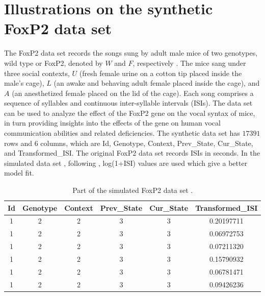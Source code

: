 \section{Illustrations on the synthetic FoxP2 data set}\label{sec:foxp2}
The FoxP2 data set records the songs sung by adult male mice of two genotypes, wild type or FoxP2, denoted by $W$ and $F$, respectively \citep{Chabout_etal:2016}. 
The mice sang under three social contexts, $U$ (fresh female urine on a cotton tip placed inside the male's cage), $L$ (an awake and behaving adult female placed inside the cage), and $A$ (an anesthetized female placed on the lid of the cage). 
Each song comprises a sequence of syllables and continuous inter-syllable intervals (ISIs).
The data set can be used to analyze the effect of the FoxP2 gene on the vocal syntax of mice, 
in turn providing insights into the effects of the gene on human vocal communication abilities and related deficiencies.
The  synthetic data set has $17391$ rows and $6$ columns, which are Id, Genotype, Context, Prev\_State, Cur\_State, and Transformed\_ISI. 
The original FoxP2 data set records ISIs in seconds. 
In the simulated data set , following \citet{wu2021bayesian}, log(1+ISI) values are used which give a better model fit. 


\begin{table}[h]
    \centering
    \begin{tabular}{cccccc}
    \toprule
Id & Genotype& Context &Prev\_State& Cur\_State    &    {Transformed\_ISI} \\\midrule
1     &   2     &  2      &    3     &    3 & 0.20197711\\
1     &   2     &  2      &    3     &    3 & 0.06972753\\
1     &   2     &  2      &    3     &    3 & 0.07211320\\
1     &   2     &  2      &    3     &    3 & 0.15790932\\
1     &   2     &  2      &    3     &    3 & 0.06781471\\
1     &   2     &  2      &    3     &    3 & 0.09426236\\\bottomrule
    \end{tabular}
    \caption{Part of the simulated FoxP2 data set .}
    \label{tab:foxp2}
\end{table}



